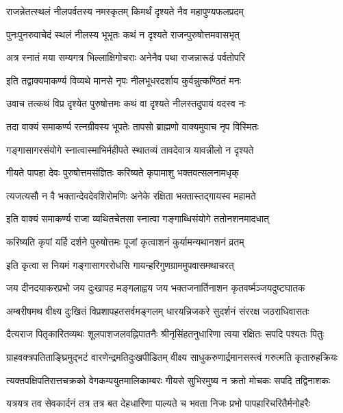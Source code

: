 \twolineshloka
{राजन्नेतत्स्थलं नीलपर्वतस्य नमस्कृतम्}
{किमर्थं दृश्यते नैव महापुण्यफलप्रदम्}%

\twolineshloka
{पुनःपुनरुवाचेदं स्थलं नीलस्य भूभृतः}
{कथं न दृश्यते राजन्पुरुषोत्तमवासभृत्}%

\twolineshloka
{अत्र स्नातं मया सम्यगत्र भिल्लाक्षिगोचराः}
{अनेनैव पथा राजन्नारूढं पर्वतोपरि}%

\twolineshloka
{इति तद्वाक्यमाकर्ण्य विव्यथे मानसे नृपः}
{नीलभूधरदर्शाय कुर्वन्नुत्कण्ठितं मनः}%

\twolineshloka
{उवाच तत्कथं विप्र दृश्येत पुरुषोत्तमः}
{कथं वा दृश्यते नीलस्तदुपायं वदस्व नः}%

\twolineshloka
{तदा वाक्यं समाकर्ण्य रत्नग्रीवस्य भूपतेः}
{तापसो ब्राह्मणो वाक्यमुवाच नृप विस्मितः}%

\twolineshloka
{गङ्गासागरसंयोगे स्नात्वास्माभिर्महीपते}
{स्थातव्यं तावदेवात्र यावन्नीलो न दृश्यते}%

\twolineshloka
{गीयते पापहा देवः पुरुषोत्तमसंज्ञितः}
{करिष्यते कृपामाशु भक्तवत्सलनामधृक्}%

\twolineshloka
{त्यजत्यसौ न वै भक्तान्देवदेवशिरोमणिः}
{अनेके रक्षिता भक्तास्तद्गायस्व महामते}%

\twolineshloka
{इति वाक्यं समाकर्ण्य राजा व्यथितचेतसा}
{स्नात्वा गङ्गाब्धिसंयोगे ततोनशनमादधात्}%

\twolineshloka
{करिष्यति कृपां यर्हि दर्शने पुरुषोत्तमः}
{पूजां कृत्वाशनं कुर्यामन्यथानशनं व्रतम्}%

\twolineshloka
{इति कृत्वा स नियमं गङ्गासागररोधसि}
{गायन्हरिगुणग्राममुपवासमथाचरत्}%


\twolineshloka
{जय दीनदयाकरप्रभो जय दुःखापह मङ्गलाह्वय}
{जय भक्तजनार्तिनाशन कृतवर्ष्मञ्जयदुष्टघातक}%

\twolineshloka
{अम्बरीषमथ वीक्ष्य दुःखितं विप्रशापहतसर्वमङ्गलम्}
{धारयन्निजकरे सुदर्शनं संररक्ष जठराधिवासतः}%

\twolineshloka
{दैत्यराज पितृकारितव्यथः शूलपाशजलवह्निपातनैः}
{श्रीनृसिंहतनुधारिणा त्वया रक्षितः सपदि पश्यतः पितुः}%

\twolineshloka
{ग्राहवक्त्रपतिताङ्घ्रिमुद्भटं वारणेन्द्रमतिदुःखपीडितम्}
{वीक्ष्य साधुकरुणार्द्रमानसस्त्वं गरुत्मति कृतारुहक्रियः}%

\twolineshloka
{त्यक्तपक्षिपतिरात्तचक्रको वेगकम्पयुतमालिकाम्बरः}
{गीयसे सुभिरमुष्य न क्रतो मोचकः सपदि तद्विनाशकः}%

\twolineshloka
{यत्रयत्र तव सेवकार्दनं तत्र तत्र बत देहधारिणा}
{पाल्यते च भवता निजः प्रभो पापहारिचरितैर्मनोहरैः}%

